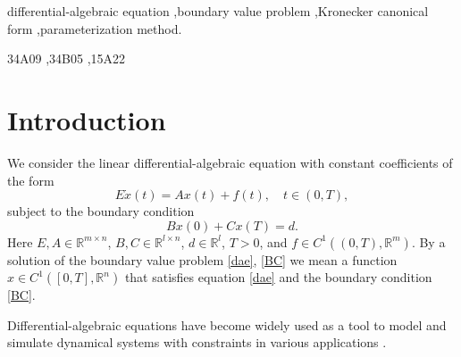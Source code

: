\documentclass[preprint,12pt]{elsarticle}
\numberwithin{equation}{section}
\theoremstyle{definition}
\begin{document}
\begin{frontmatter}
\begin{abstract}
The solvability of two-point boundary value problems for constant-coefficient differential-algebraic equations is investigated. Unlike previous studies, which often assume that the matrix pair associated with the equation is regular, we consider the general singular case. Using the Kronecker canonical form, we decompose the problem into simpler subsystems, enabling a systematic analysis of solvability. The method of parameterization reduces the boundary value problem to a system of algebraic equations. We derive criteria for the existence and uniqueness of solutions and provide a comprehensive framework for solving such boundary value problems. Several illustrative examples are presented and show the applicability of the results.
\end{abstract}

\begin{keyword}
differential-algebraic equation \sep boundary value problem \sep Kronecker
 canonical form \sep parameterization method.

\MSC 34A09 \sep 34B05 \sep 15A22
\end{keyword}

\end{frontmatter}

\section{Introduction}

We consider the linear differential-algebraic equation with constant coefficients of the form
\begin{equation}\label{dae}
E\dot{x}(t)=Ax(t)+f(t), \quad t\in (0,T),
\end{equation}
subject to the boundary condition
\begin{equation}\label{BC}
Bx(0)+Cx(T)=d.
\end{equation}
Here $E, A\in \mathbb{R}^{m\times n}$, $B,C\in \mathbb{R}^{l\times n}$, $d\in\mathbb{R}^l$, $T>0$, and $f\in C^1((0,T),\mathbb{R}^m)$.
By a solution of the boundary value problem \eqref{dae}, \eqref{BC} we mean a function $x\in C^1([0,T],\mathbb{R}^n)$ that satisfies equation \eqref{dae} and the boundary condition \eqref{BC}.

Differential-algebraic equations have become widely used as a tool to model and simulate dynamical systems with constraints in various applications \cite{Kunkel:2006,brenan1995numerical,ascher1998computer,lamour2013differential, riaza2008differential}. 
\end{document}

